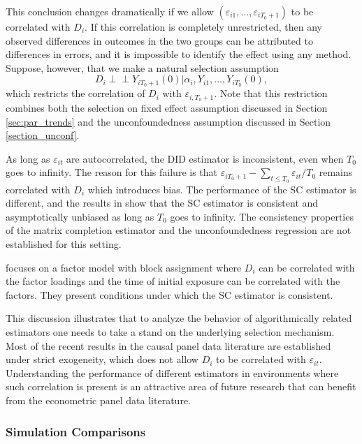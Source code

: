 \documentclass[letterpaper,12pt,leqno]{article}
\newcommand{\indep}{\perp\!\!\!\perp}
\begin{document}
This conclusion changes dramatically if we allow $(\varepsilon_{i1},\dots, \varepsilon_{iT_0+1})$ to be correlated with $D_i$. If this correlation is completely unrestricted, then any observed differences in outcomes in the two groups can be attributed to differences in errors, and it is impossible to identify the effect using any method. Suppose, however, that we make a natural selection assumption
\begin{equation*}
    D_i \indep Y_{iT_0+1}(0) | \alpha_i, Y_{i1}, \dots, Y_{iT_0}(0), 
\end{equation*}
which restricts the correlation of $D_i$ with $\varepsilon_{i,T_0+1}$. Note that this restriction combines both the selection on fixed effect assumption discussed in Section \ref{sec:par_trends} and the unconfoundedness assumption discussed in Section \ref{section_unconf}. 

As long as $\varepsilon_{it}$ are autocorrelated, the DID estimator is inconsistent, even when $T_0$ goes to infinity. The reason for this failure is that $\varepsilon_{iT_0+1} - \sum_{t\le T_0} \varepsilon_{it}/T_0$ remains correlated with $D_i$ which introduces bias. The performance of the SC estimator is different, and the results in \citep*{arkhangelsky2023synth} show that the SC estimator is consistent and asymptotically unbiased as long as $T_0$ goes to infinity. 
The consistency properties of the matrix completion estimator and the unconfoundedness regression are not established for this setting.


\citep{viviano} focuses on a factor model with block assignment where $D_i$ can be correlated with the factor loadings and the time of initial exposure can be correlated with the factors. They present conditions under which the SC estimator is consistent.

This discussion illustrates that to analyze the behavior of algorithmically related estimators one needs to take a stand on the underlying selection mechanism. Most of the recent results in the causal panel data literature are established under strict exogeneity, which does not allow $D_i$ to be correlated with $\varepsilon_{it}$. Understanding the performance of different estimators in environments where such correlation is present is an attractive area of future research that can benefit from the econometric panel data literature.

\subsubsection{Simulation Comparisons}
\end{document}

